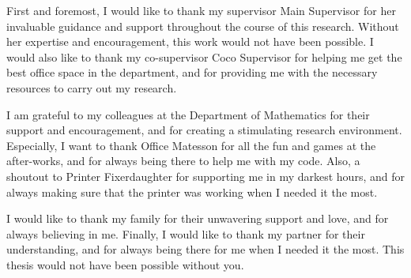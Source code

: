 First and foremost, I would like to thank my supervisor
Main Supervisor for her invaluable guidance and support throughout the course of this research.
Without her expertise and encouragement, this work would not have been possible.
I would also like to thank my co-supervisor Coco Supervisor for helping me get the best office
space in the department, and for providing me with the necessary resources to carry out my research.

I am grateful to my colleagues at the Department of Mathematics for their support and
encouragement, and for creating a stimulating research environment.
Especially, I want to thank Office Matesson for all the fun and games at the after-works, and for
always being there to help me with my code.
Also, a shoutout to Printer Fixerdaughter for supporting me in my darkest hours, and for
always making sure that the printer was working when I needed it the most.

I would like to thank my family for their unwavering support and love, and for always
believing in me.
Finally, I would like to thank my partner for their understanding,
and for always being there for me when I needed it the most.
This thesis would not have been possible without you.
